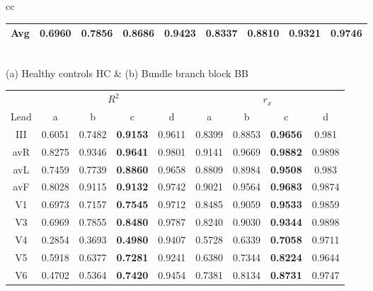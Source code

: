 \begin{table}[t!]
\begin{center}
\begin{tabular}{cc}
{\begin{footnotesize}
\begin{tabular}{|c|cccc|cccc|}
\hline

Avg & 0.6960 & 0.7856 & \textbf{0.8686} & 0.9423 & 0.8337 & 0.8810 & \textbf{0.9321} & 0.9746 \\

\hline
\end{tabular}
\end{footnotesize}
} \\
(a) Healthy controls HC & (b) Bundle branch block BB\\
{
\begin{footnotesize}
\begin{tabular}{|c|cccc|cccc|}
\hline

\cline{2-9}
& \multicolumn{4}{c|}{$R^2$}
& \multicolumn{4}{c|}{$r_x$} \\
\cline{2-9}

Lead & a & b & c & d & a & b & c & d \\
\hline
III & 0.6051 & 0.7482 & \textbf{0.9153} & 0.9611 & 0.8399 & 0.8853 & \textbf{0.9656} & 0.981
  \\

avR & 0.8275 & 0.9346 & \textbf{0.9641} & 0.9801 & 0.9141 & 0.9669 & \textbf{0.9882} & 0.9898
  \\

avL & 0.7459 & 0.7739 & \textbf{0.8860} & 0.9658 & 0.8809 & 0.8984 & \textbf{0.9508} & 0.983
  \\

avF & 0.8028 & 0.9115 & \textbf{0.9132} & 0.9742 & 0.9021 & 0.9564 & \textbf{0.9683} & 0.9874
  \\

V1 & 0.6973 & 0.7157 & \textbf{0.7545} & 0.9712 & 0.8485 & 0.9059 & \textbf{0.9533} & 0.9859
  \\

V3 & 0.6969 & 0.7855 & \textbf{0.8480} & 0.9787 & 0.8240 & 0.9030 & \textbf{0.9344} & 0.9898
  \\

V4 & 0.2854 & 0.3693 & \textbf{0.4980} & 0.9407 & 0.5728 & 0.6339 & \textbf{0.7058} & 0.9711
  \\

V5 & 0.5918 & 0.6377 & \textbf{0.7281} & 0.9241 & 0.6380 & 0.7344 & \textbf{0.8224} & 0.9644
  \\

V6 & 0.4702 & 0.5364 & \textbf{0.7420} & 0.9454 & 0.7381 & 0.8134 & \textbf{0.8731} & 0.9747


\end{tabular}
\end{footnotesize}}
\end{tabular}
\end{center}
\end{table}
